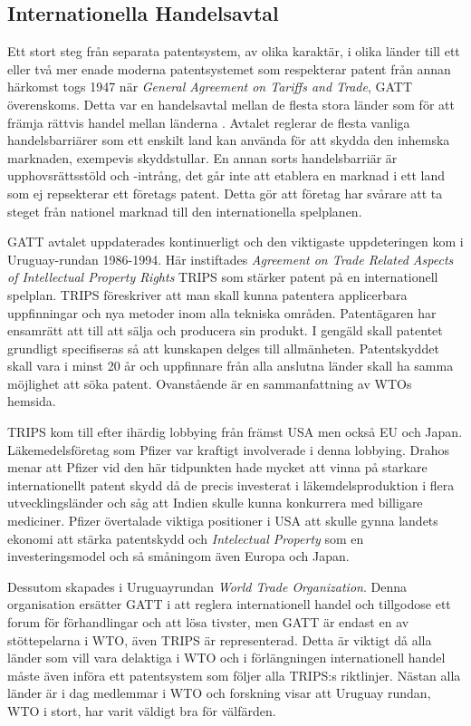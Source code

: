 
\subsection{Internationella Handelsavtal}
Ett stort steg från separata patentsystem, av olika karaktär, i olika länder till ett eller två mer enade moderna patentsystemet som respekterar patent från annan härkomst togs 1947 när \emph{General Agreement on Tariffs and Trade}, GATT överenskoms. Detta var en handelsavtal mellan de flesta stora länder som för att främja rättvis handel mellan länderna \cite{gatt}. Avtalet reglerar de flesta vanliga handelsbarriärer som ett enskilt land kan använda för att skydda den inhemska marknaden, exempevis skyddstullar. En annan sorts handelsbarriär är upphovsrättsstöld och -intrång, det går inte att etablera en marknad i ett land som ej repsekterar ett företags patent. Detta gör att företag har svårare att ta steget från nationel marknad till den internationella spelplanen.

GATT avtalet uppdaterades kontinuerligt och den viktigaste uppdeteringen kom i Uruguay-rundan 1986-1994. Här instiftades \emph{Agreement on Trade Related Aspects of Intellectual Property Rights} TRIPS som stärker patent på en internationell spelplan. TRIPS föreskriver att man skall kunna patentera applicerbara uppfinningar och nya metoder inom alla tekniska områden. Patentägaren har ensamrätt att till att sälja och producera sin produkt. I gengäld skall patentet grundligt specifiseras så att kunskapen delges till allmänheten. Patentskyddet skall vara  i minst 20 år och uppfinnare från alla anslutna länder skall ha samma möjlighet att söka patent. Ovanstående är en sammanfattning av WTOs hemsida\cite{wto}.

TRIPS kom till efter ihärdig lobbying från främst USA men också EU och Japan\cite{drahos}. Läkemedelsföretag som Pfizer var kraftigt involverade i denna lobbying\cite{drahos}. Drahos menar att Pfizer vid den här tidpunkten hade mycket att vinna på starkare internationellt patent skydd då de precis investerat i läkemdelsproduktion i flera utvecklingsländer och såg att Indien skulle kunna konkurrera med billigare mediciner\cite{drahos}. Pfizer övertalade viktiga positioner i USA att skulle gynna landets ekonomi att stärka patentskydd och \emph{Intelectual Property} som en investeringsmodel och så småningom även Europa och Japan\cite{drahos}.

Dessutom skapades i Uruguayrundan \emph{World Trade Organization}. Denna organisation ersätter GATT i att reglera internationell handel och tillgodose ett forum för förhandlingar och att lösa tivster, men GATT är endast en av stöttepelarna i WTO, även TRIPS är representerad. Detta är viktigt då alla länder som vill vara delaktiga i WTO och i förlängningen internationell handel måste även införa ett patentsystem som följer alla TRIPS:s riktlinjer. Nästan alla länder är i dag medlemmar i WTO och forskning visar att Uruguay rundan, WTO i stort, har varit väldigt bra för välfärden\cite{harrison}. 

